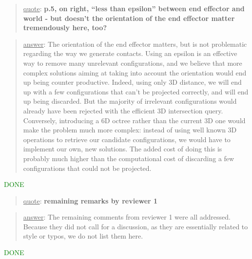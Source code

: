 \documentclass[a4paper]{article}
\newcommand{\done}[0]{\textcolor{green}{DONE}}
\newcommand\quot[1]{\begin{quote} \underline{quote}: \textbf{#1}\end{quote}}
\newcommand\as[1]{\begin{quote} \underline{answer}: {#1}\end{quote} }
\begin{document}
\quot{p.5, on right, ``less than epsilon'' between end effector and world - but doesn’t the orientation of the end effector matter tremendously here, too?}
\as{
The orientation of the end effector matters, but is not problematic regarding the way we generate contacts.
Using an epsilon is an effective way to remove many unrelevant configurations, and
we believe that more complex solutions aiming at taking into account the orientation would end up being counter productive.
 Indeed, using only 3D distance, we will end up with a few configurations
that can't be projected correctly, and will end up being discarded. But the majority of irrelevant configurations would already have been rejected with
the efficient 3D intersection query. Conversely, introducing a 6D octree rather than the current 3D one would make the problem much more complex: instead
of using well known 3D operations to retrieve our candidate configurations, we would have to implement our own, new solutions. The added cost of doing this is probably 
much higher than the computational cost of discarding a few configurations that could not be projected.  } \done

\quot{remaining remarks by reviewer 1}
\as{The remaining comments from reviewer 1 were all addressed. Because they did not call for a discussion, as they are essentially related to style or typos, we do not list them here.}\done
\end{document}
